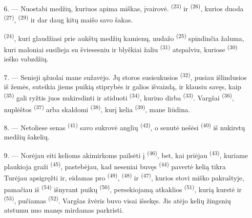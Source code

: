 6. --- Nuostabi medžių, kuriuos apima miškas, įvairovė. 
\textsuperscript{(23)} ir  \textsuperscript{(26)}, 
kurios duoda  \textsuperscript{(27)}, 
\textsuperscript{(29)} ir dar daug kitų maišo savo šakas.

 \textsuperscript{(24)}, kuri glaudžiasi prie aukštų medžių kamienų,
nudažo  \textsuperscript{(25)} spindinčia žaluma, kuri maloniai
susilieja su šviesesniu ir blyškiai žaliu  \textsuperscript{(31)}
atspalviu, kuriose  \textsuperscript{(30)} ieško vabzdžių.

\VUsaut{3.0mm}
\VUsaut{3.0mm}

7. --- Senieji ąžuolai mane sužavėjo. Jų storos susisukusios 
\textsuperscript{(32)}, pusiau išlindusios iš žemės, suteikia jiems puikią stiprybės
ir galios išvaizdą, ir klausiu savęs, kaip 
\textsuperscript{(35)} gali ryžtis juos nukirsdinti ir atiduoti 
\textsuperscript{(34)}, kuriuo dirba  \textsuperscript{(33)}. Vargšai
 \textsuperscript{(36)}, nuplėštos 
\textsuperscript{(37)} arba skaldomi  \textsuperscript{(38)}, kurį kelia
 \textsuperscript{(39)}, mane liūdina.

8. --- Netoliese senas  \textsuperscript{(41)} savo
 sukrovė anglių  \textsuperscript{(42)}, o senutė
nešėsi  \textsuperscript{(40)}  iš nukirstų medžių
šakelių.

\VUsaut{3.0mm}
\VUsaut{3.0mm}

9. --- Norėjau eiti kelioms akimirkoms pailsėti į 
\textsuperscript{(46)}, bet, kai priėjau  \textsuperscript{(43)},
kuriame plaukioja graži  \textsuperscript{(45)}, pastebėjau, kad
neseniai buvęs  \textsuperscript{(44)} pavertė kelią tikra
 Turėjau apsigręžti ir, eidamas pro 
\textsuperscript{(49)},  \textsuperscript{(48)} ir 
\textsuperscript{(47)}, kurios stovi miško pakraštyje, pamačiau iš 
\textsuperscript{(54)} išnyrant puikų  \textsuperscript{(50)},
persekiojamą atkaklios  \textsuperscript{(51)},
kurią kurstė ir  \textsuperscript{(53)}, pučiamas  \textsuperscript{(52)}. Vargšas žvėris buvo visai išsekęs. Jis atėjo
kelių žingsnių
atstumu nuo manęs mirdamas parkristi.

